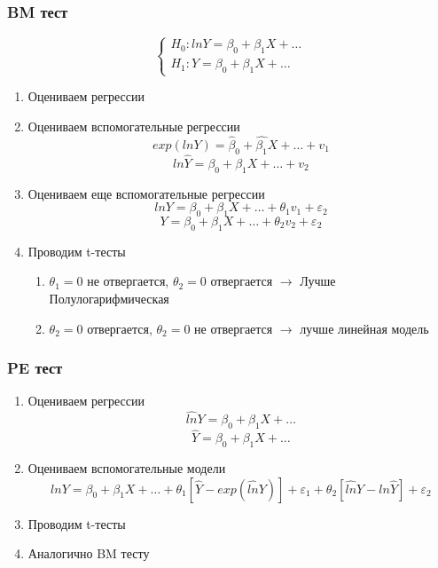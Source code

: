 \documentclass[a4paper, 12pt]{article}
\begin{document}
\subsubsection{BM тест}

\[
\begin{cases}
    H_0: lnY = \beta_0 + \beta_1 X + \ldots \\
    H_1: Y = \beta_0 + \beta_1 X + \ldots
\end{cases}    
\]

\begin{enumerate}
    \item Оцениваем регрессии
    \item Оцениваем вспомогательные регрессии
    \[exp(lnY) = \hat{\beta}_0 + \hat{\beta_1}X + \ldots + v_1\]
    \[ln\hat{Y} = \beta_0 + \beta_1 X + \ldots + v_2\]
    \item Оцениваем еще вспомогательные регрессии
    \[lnY = \beta_0 + \beta_1 X + \ldots + \theta_1 v_1 + \varepsilon_2\]
    \[Y = \beta_0 + \beta_1 X + \ldots + \theta_2 v_2 + \varepsilon_2\]
    \item Проводим t-тесты
    \begin{enumerate}
        \item $\theta_1 = 0$ не отвергается, 
        $\theta_2 = 0$ отвергается $\rightarrow$ 
        Лучше Полулогарифмическая
        \item $\theta_2 = 0$ отвергается, 
        $\theta_2 = 0$ не отвергается $\rightarrow$
        лучше линейная модель
    \end{enumerate}
\end{enumerate}

\subsubsection{PE тест}

\begin{enumerate}
    \item Оцениваем регрессии
    \[\hat{ln}Y = \beta_0 + \beta_1 X + \ldots\]
    \[\hat{Y} = \beta_0 + \beta_1 X + \ldots\]
    \item Оцениваем вспомогательные модели
    \[lnY = \beta_0 + \beta_1 X + \ldots + 
    \theta_1\left[\hat{Y} - exp(\hat{ln}Y)\right] + \varepsilon_1 + 
    \theta_2\left[\hat{ln}Y - ln\hat{Y}\right] + \varepsilon_2\]
    \item Проводим t-тесты
    \item Аналогично BM тесту
\end{enumerate}
\end{document}
